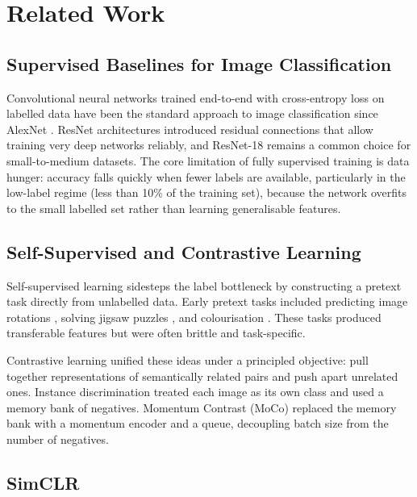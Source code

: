 \documentclass[twoside,a4paper,11pt]{article}
\begin{document}
\section{Related Work}
\label{sec:related}

\subsection{Supervised Baselines for Image Classification}

Convolutional neural networks trained end-to-end with cross-entropy loss on labelled
data have been the standard approach to image classification since AlexNet
\cite{krizhevsky2012imagenet}. ResNet architectures \cite{he2016resnet} introduced
residual connections that allow training very deep networks reliably, and ResNet-18
remains a common choice for small-to-medium datasets. The core limitation of fully
supervised training is data hunger: accuracy falls quickly when fewer labels are
available, particularly in the low-label regime (less than 10\% of the training set),
because the network overfits to the small labelled set rather than learning
generalisable features.

\subsection{Self-Supervised and Contrastive Learning}

Self-supervised learning sidesteps the label bottleneck by constructing a pretext task
directly from unlabelled data. Early pretext tasks included predicting image
rotations \cite{gidaris2018rotnet}, solving jigsaw puzzles \cite{noroozi2016jigsaw},
and colourisation \cite{zhang2016colorization}. These tasks produced transferable
features but were often brittle and task-specific.

Contrastive learning unified these ideas under a principled objective: pull together
representations of semantically related pairs and push apart unrelated ones. Instance
discrimination \cite{wu2018unsupervised} treated each image as its own class and used
a memory bank of negatives. Momentum Contrast (MoCo) \cite{he2020moco} replaced the
memory bank with a momentum encoder and a queue, decoupling batch size from the number
of negatives.

\subsection{SimCLR}
\end{document}
